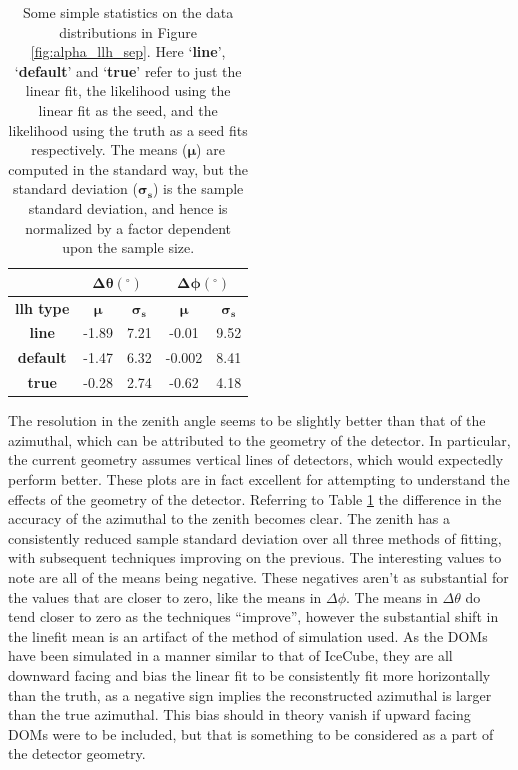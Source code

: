 \begin{table}[H]
  \centering
  \begin{tabular}{|c|c|c|c|c|} 
    \hline
     & \multicolumn{2}{|c|}{$\bm{\Delta\theta(^{\circ})}$} & \multicolumn{2}{|c|}{$\bm{\Delta\phi(^{\circ})}$} \\
    \hline\hline
    \textbf{llh type} & $\bm{\mu}$ & $\bm{\sigma_{s}}$ & $\bm{\mu}$ & $\bm{\sigma_{s}}$ \\
    \hline\hline
    \textbf{line} & -1.89 & 7.21 & -0.01 & 9.52 \\
    \hline
    \textbf{default} & -1.47 & 6.32 & -0.002 & 8.41 \\
    \hline
    \textbf{true} & -0.28 & 2.74 & -0.62 & 4.18 \\
    \hline
  \end{tabular}
  \caption{Some simple statistics on the data distributions in Figure \ref{fig:alpha_llh_sep}. Here `\textbf{line}', `\textbf{default}' and `\textbf{true}' refer to just the linear fit, the likelihood using the linear fit as the seed, and the likelihood using the truth as a seed fits respectively. The means ($\bm{\mu}$) are computed in the standard way, but the standard deviation ($\bm{\sigma_{s}}$) is the sample standard deviation, and hence is normalized by a factor dependent upon the sample size. }
  \label{tab:angular_diff}
\end{table}

The resolution in the zenith angle seems to be slightly better than that of the azimuthal, which can be attributed to the geometry of the detector. In particular, the current geometry assumes vertical lines of detectors, which would expectedly perform better. These plots are in fact excellent for attempting to understand the effects of the geometry of the detector. Referring to Table \ref{tab:angular_diff} the difference in the accuracy of the azimuthal to the zenith becomes clear. The zenith has a consistently reduced sample standard deviation over all three methods of fitting, with subsequent techniques improving on the previous. The interesting values to note are all of the means being negative. These negatives aren't as substantial for the values that are closer to zero, like the means in $\Delta\phi$. The means in $\Delta\theta$ do tend closer to zero as the techniques ``improve'', however the substantial shift in the linefit mean is an artifact of the method of simulation used. As the DOMs have been simulated in a manner similar to that of IceCube, they are all downward facing and bias the linear fit to be consistently fit more horizontally than the truth, as a negative sign implies the reconstructed azimuthal is larger than the true azimuthal. This bias should in theory vanish if upward facing DOMs were to be included, but that is something to be considered as a part of the detector geometry.

